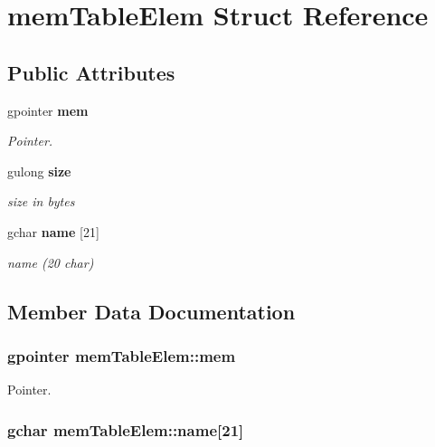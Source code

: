 \section{mem\-Table\-Elem Struct Reference}
\label{structmemTableElem}
\subsection*{Public Attributes}
\begin{CompactItemize}
\item 
gpointer {\bf mem}
\begin{CompactList}\small\item\em Pointer. \item\end{CompactList}\item 
gulong {\bf size}
\begin{CompactList}\small\item\em size in bytes \item\end{CompactList}\item 
gchar {\bf name} [21]
\begin{CompactList}\small\item\em name (20 char) \item\end{CompactList}\end{CompactItemize}


\subsection{Member Data Documentation}
\subsubsection{\setlength{\rightskip}{0pt plus 5cm}gpointer {\bf mem\-Table\-Elem::mem}}\label{structmemTableElem_o0}


Pointer. 

\subsubsection{\setlength{\rightskip}{0pt plus 5cm}gchar {\bf mem\-Table\-Elem::name}[21]}\label{structmemTableElem_o2}


